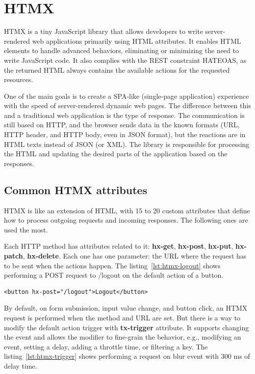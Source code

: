 \section{HTMX}

HTMX is a tiny JavaScript library that allows developers to write server-rendered web applications primarily using HTML attributes. It enables HTML elements to handle advanced behaviors, eliminating or minimizing the need to write JavaScript code. It also complies with the REST constraint HATEOAS, as the returned HTML always contains the available actions for the requested resources.

One of the main goals is to create a SPA-like (single-page application) experience with the speed of server-rendered dynamic web pages. The difference between this and a traditional web application is the type of response. The communication is still based on HTTP, and the browser sends data in the known formats (URL, HTTP header, and HTTP body, even in JSON format), but the reactions are in HTML texts instead of JSON (or XML). The library is responsible for processing the HTML and updating the desired parts of the application based on the responses.

\subsection{Common HTMX attributes}

HTMX is like an extension of HTML, with 15 to 20 custom attributes that define how to process outgoing requests and incoming responses. The following ones are used the most.

Each HTTP method has attributes related to it: \textbf{hx-get}, \textbf{hx-post}, \textbf{hx-put}, \textbf{hx-patch}, \textbf{hx-delete}. Each one has one parameter: the URL where the request has to be sent when the actions happen. The listing~\ref{lst:htmx-logout} shows performing a POST request to /logout on the default action of a button.

\begin{lstlisting}[caption=Preforming an \textbf{hx-post} request,label=lst:htmx-logout, float]
<button hx-post="/logout">Logout</button>
\end{lstlisting}

By default, on form submission, input value change, and button click, an HTMX request is performed when the method and URL are set. But there is a way to modify the default action trigger with \textbf{tx-trigger} attribute. It supports changing the event and allows the modifier to fine-grain the behavior, e.g., modifying an event, setting a delay, adding a throttle time, or filtering a key. The listing~\ref{lst:htmx-trigger} shows performing a request on blur event with 300 ms of delay time.

